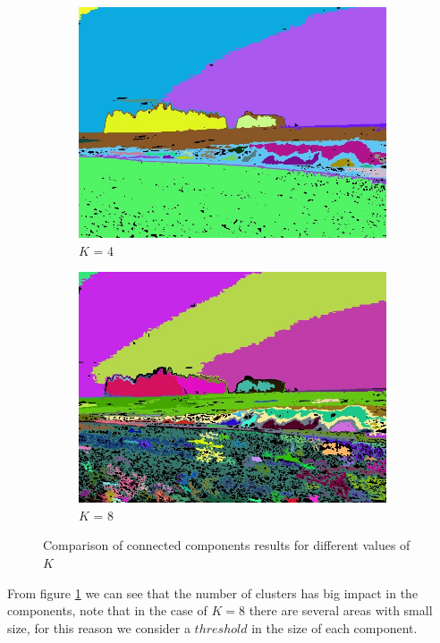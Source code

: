 \begin{figure}[H]
\begin{subfigure}{0.5\textwidth}
        \centering
        \includegraphics[width=0.9\linewidth]{figs/beach_1_compK4.jpg}
        \caption{$K$ = 4}
    \end{subfigure}%
    \begin{subfigure}{0.5\textwidth}
	  \centering
	  \includegraphics[width=0.9\linewidth]{figs/beach_1_compK8.jpg}
	\caption{$K$ = 8}
	\end{subfigure}
	
    \caption{Comparison of connected components results for different values of $K$}
	\label{fig:components}
\end{figure}

From figure \ref{fig:components} we can see that the number of clusters has big impact in the components, note that in the case of $K= 8$ there are several areas with small size, for this reason we consider a $threshold$ in the size of each component.

